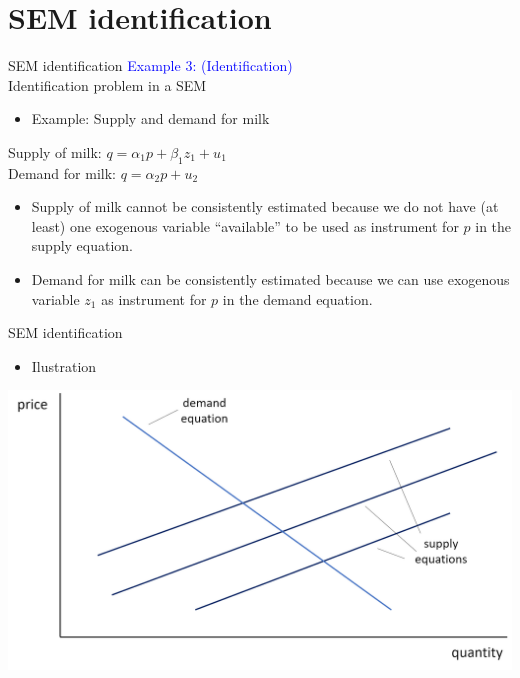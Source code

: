 \documentclass[usenames,dvipsnames]{beamer}
\begin{document}
\section{SEM identification}
\begin{frame}{SEM identification}
\textcolor{Blue}{Example 3: (Identification)}\\
Identification problem in a SEM\\ 
\vspace{0.5cm}
\begin{itemize}
\item Example: Supply and demand for milk
\end{itemize}
\qquad Supply of milk: \qquad $q = \alpha_1 p + \beta_1 z_1 + u_1$ \\
\qquad Demand for milk: \quad $q = \alpha_2 p + u_2$ \\
\medskip
\begin{itemize}
\item Supply of milk cannot be consistently estimated because we do not have (at least) one exogenous variable  ``available'' to be used as instrument for $p$ in the supply equation.\\
\medskip
\item Demand for milk can be consistently estimated because we can use exogenous variable $z_1$  as instrument for $p$ in the demand equation.
\end{itemize}
\end{frame}
\begin{frame}{SEM identification}
\begin{itemize}
\item Ilustration 
\end{itemize}
\medskip
\includegraphics[width=\textwidth]{./img/W9_Obrazek_1}
\end{frame}
\end{document}
